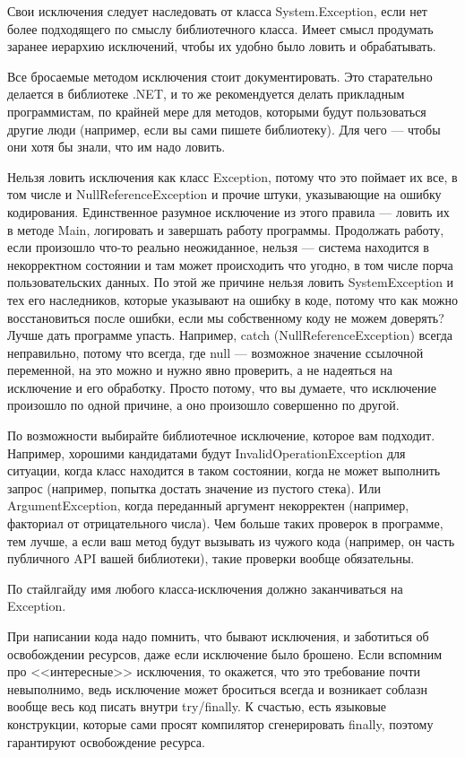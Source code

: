 \documentclass{../../text-style}
\begin{document}
Свои исключения следует наследовать от класса System.Exception, если нет более подходящего по смыслу библиотечного класса. Имеет смысл продумать заранее иерархию исключений, чтобы их удобно было ловить и обрабатывать.

Все бросаемые методом исключения стоит документировать. Это старательно делается в библиотеке .NET, и то же рекомендуется делать прикладным программистам, по крайней мере для методов, которыми будут пользоваться другие люди (например, если вы сами пишете библиотеку). Для чего --- чтобы они хотя бы знали, что им надо ловить.

Нельзя ловить исключения как класс Exception, потому что это поймает их все, в том числе и NullReferenceException и прочие штуки, указывающие на ошибку кодирования. Единственное разумное исключение из этого правила --- ловить их в методе Main, логировать и завершать работу программы. Продолжать работу, если произошло что-то реально неожиданное, нельзя --- система находится в некорректном состоянии и там может происходить что угодно, в том числе порча пользовательских данных. По этой же причине нельзя ловить SystemException и тех его наследников, которые указывают на ошибку в коде, потому что как можно восстановиться после ошибки, если мы собственному коду не можем доверять? Лучше дать программе упасть. Например, catch (NullReferenceException) всегда неправильно, потому что всегда, где null --- возможное значение ссылочной переменной, на это можно и нужно явно проверить, а не надеяться на исключение и его обработку. Просто потому, что вы думаете, что исключение произошло по одной причине, а оно произошло совершенно по другой.

По возможности выбирайте библиотечное исключение, которое вам подходит. Например, хорошими кандидатами будут InvalidOperationException для ситуации, когда класс находится в таком состоянии, когда не может выполнить запрос (например, попытка достать значение из пустого стека). Или ArgumentException, когда переданный аргумент некорректен (например, факториал от отрицательного числа). Чем больше таких проверок в программе, тем лучше, а если ваш метод будут вызывать из чужого кода (например, он часть публичного API вашей библиотеки), такие проверки вообще обязательны.

По стайлгайду имя любого класса-исключения должно заканчиваться на Exception.

При написании кода надо помнить, что бывают исключения, и заботиться об освобождении ресурсов, даже если исключение было брошено. Если вспомним про <<интересные>> исключения, то окажется, что это требование почти невыполнимо, ведь исключение может броситься всегда и возникает соблазн вообще весь код писать внутри try/finally. К счастью, есть языковые конструкции, которые сами просят компилятор сгенерировать finally, поэтому гарантируют освобождение ресурса.
\end{document}
